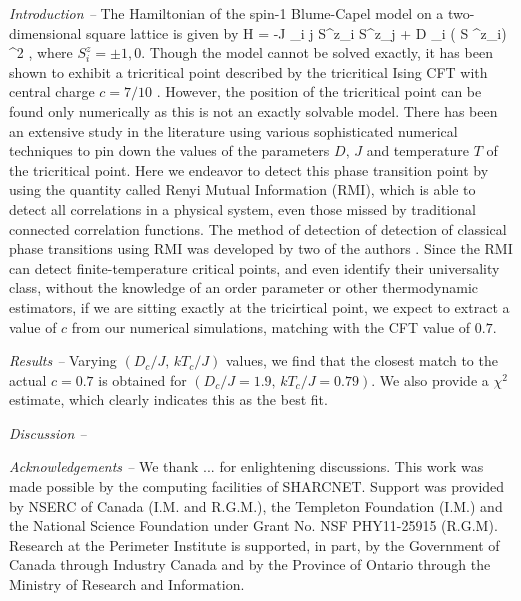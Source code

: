 \documentclass[aps,prl,superscriptaddress,twocolumn]{revtex4}
\begin{document}
{\em Introduction --}
The Hamiltonian of the
spin-1 Blume-Capel model on a two-dimensional square lattice \cite{blume,capel} is given by
\beq 
H = -J \sum_{\langle i j \rangle} S^z_i S^z_j
+ D \sum_{\langle i  \rangle} ( S ^z_i) ^2   ,
\label{bc-model}
\eeq
where $S^z_i = \pm 1, 0 $.
Though the model cannot be solved exactly, it has been shown to exhibit a tricritical point
described by the tricritical Ising CFT with central charge $c=7/10$ \cite{balbao}. However, the position of the
tricritical point can be found only numerically as this is not an exactly solvable model. There has been
an extensive study in the literature using various sophisticated numerical techniques \cite{burk,berker,burk2,ng,landau,selke,chak,beale,landau2,tucker,du,du2,silva,yusuf} to pin down the values of the parameters $D , \, J$ and temperature $ T $ of the tricritical point. Here we endeavor to detect this
phase transition point by using the quantity called Renyi Mutual Information (RMI), which is able to detect all correlations in a physical system, even those
missed by traditional connected correlation functions. The method of detection of detection of classical phase transitions using RMI was developed by two of the authors \citep{stephen2013,stephen2014}.
Since the RMI can detect finite-temperature critical points, and even identify their universality class,
without the knowledge of an order parameter or other thermodynamic estimators, if we are sitting exactly at
the tricirtical point, we expect to extract a value of $c$ from our numerical simulations, matching with the CFT value of $0.7$.


{\em Results --}
Varying $\left ( D_c /J , \, k T_c / J \right ) $ values, we find that the closest match to the actual $c=0.7$ is obtained for $\left ( D_c /J =1.9 , \, k T_c / J =0.79 \right ) $. We also provide a $\chi^2$ estimate, which clearly
indicates this as the best fit.







{\em Discussion --}




{\em Acknowledgements --} We thank ... for enlightening discussions.  
 This work was made possible by the computing facilities of SHARCNET. Support was provided 
by NSERC of Canada (I.M. and R.G.M.), the Templeton
Foundation (I.M.) and the National Science Foundation under Grant No. NSF PHY11-25915 (R.G.M). Research at the Perimeter Institute is supported, in
part, by the Government of Canada through Industry Canada
and by the Province of Ontario through the Ministry of
Research and Information.



\end{document}
